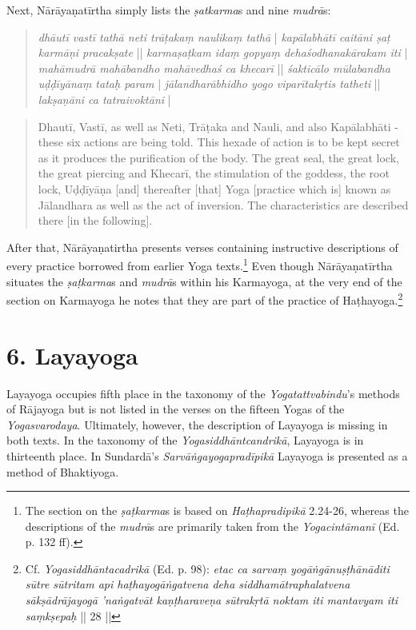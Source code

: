 Next, Nārāyaṇatīrtha simply lists the \textit{ṣatkarma}s and nine \textit{mudrā}s: 
\begin{quote}
\textit{dhāutī vastī tathā neti trāṭakaṃ naulikaṃ tathā} |
\textit{kapālabhātī caitāni ṣaṭ karmāṇi pracakṣate} ||
\textit{karmaṣaṭkam idaṃ gopyaṃ dehaśodhanakārakam iti} |
\textit{mahāmudrā mahābandho mahāvedhaś ca khecarī} ||
\textit{śakticālo mūlabandha uḍḍīyānaṃ tataḥ param} |
\textit{jālandharābhidho yogo viparītakṛtis tatheti} ||
\textit{lakṣaṇāni ca tatraivoktāni} |
\end{quote}
\begin{quote}
  Dhautī, Vastī, as well as Neti, Trāṭaka and Nauli,
  and also Kapālabhāti - these six actions are being told.
  This hexade of action is to be kept secret as it produces the purification of the body.
  The great seal, the great lock, the great piercing and Khecarī,
  the stimulation of the goddess, the root lock, Uḍḍīyāṇa [and] thereafter
  [that] Yoga [practice which is] known as Jālandhara as well as the act of inversion.
  The characteristics are described there [in the following]. 
  \end{quote}

After that, Nārāyaṇatirtha presents verses containing instructive descriptions of every practice borrowed from earlier Yoga texts.\footnote{The section on the \textit{ṣaṭkarma}s is based on \textit{Haṭhapradipikā} 2.24-26, whereas the descriptions of the \textit{mudrā}s are primarily taken from the \textit{Yogacintāmanī} (Ed. p. 132 ff).} Even though Nārāyaṇatīrtha situates the \textit{ṣaṭkarma}s and \textit{mudrā}s within his Karmayoga, at the very end of the section on Karmayoga he notes that they are part of the practice of Haṭhayoga.\footnote{Cf. \textit{Yogasiddhāntacadrikā} (Ed. p. 98): \textit{etac ca sarvaṃ yogāṅgānuṣṭhānāditi sūtre sūtritam api haṭhayogāṅgatvena deha siddhamātraphalatvena sākṣādrājayogā 'naṅgatvāt kaṇṭharaveṇa sūtrakṛtā noktam iti mantavyam iti saṃkṣepaḥ} || 28 ||}

\section{6. Layayoga}
\label{layayogaintro}

Layayoga occupies fifth place in the taxonomy of the \textit{Yogatattvabindu}'s methods of Rājayoga but is not listed in the verses on the fifteen Yogas of the \textit{Yogasvarodaya}. Ultimately, however, the description of Layayoga is missing in both texts. In the taxonomy of the \textit{Yogasiddhāntcandrikā}, Layayoga is in thirteenth place. In Sundardā's \textit{Sarvāṅgayogapradīpikā} Layayoga is presented as a method of Bhaktiyoga.

